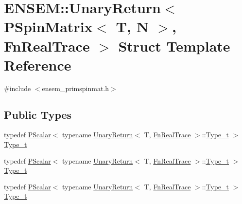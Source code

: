 \hypertarget{structENSEM_1_1UnaryReturn_3_01PSpinMatrix_3_01T_00_01N_01_4_00_01FnRealTrace_01_4}{}\section{E\+N\+S\+EM\+:\+:Unary\+Return$<$ P\+Spin\+Matrix$<$ T, N $>$, Fn\+Real\+Trace $>$ Struct Template Reference}
\label{structENSEM_1_1UnaryReturn_3_01PSpinMatrix_3_01T_00_01N_01_4_00_01FnRealTrace_01_4}


{\ttfamily \#include $<$ensem\+\_\+primspinmat.\+h$>$}

\subsection*{Public Types}
\begin{DoxyCompactItemize}
\item 
typedef \mbox{\hyperlink{classENSEM_1_1PScalar}{P\+Scalar}}$<$ typename \mbox{\hyperlink{structENSEM_1_1UnaryReturn}{Unary\+Return}}$<$ T, \mbox{\hyperlink{structENSEM_1_1FnRealTrace}{Fn\+Real\+Trace}} $>$\+::\mbox{\hyperlink{structENSEM_1_1UnaryReturn_3_01PSpinMatrix_3_01T_00_01N_01_4_00_01FnRealTrace_01_4_a7a7a0fb32831cb5d3323377a17f96cdd}{Type\+\_\+t}} $>$ \mbox{\hyperlink{structENSEM_1_1UnaryReturn_3_01PSpinMatrix_3_01T_00_01N_01_4_00_01FnRealTrace_01_4_a7a7a0fb32831cb5d3323377a17f96cdd}{Type\+\_\+t}}
\item 
typedef \mbox{\hyperlink{classENSEM_1_1PScalar}{P\+Scalar}}$<$ typename \mbox{\hyperlink{structENSEM_1_1UnaryReturn}{Unary\+Return}}$<$ T, \mbox{\hyperlink{structENSEM_1_1FnRealTrace}{Fn\+Real\+Trace}} $>$\+::\mbox{\hyperlink{structENSEM_1_1UnaryReturn_3_01PSpinMatrix_3_01T_00_01N_01_4_00_01FnRealTrace_01_4_a7a7a0fb32831cb5d3323377a17f96cdd}{Type\+\_\+t}} $>$ \mbox{\hyperlink{structENSEM_1_1UnaryReturn_3_01PSpinMatrix_3_01T_00_01N_01_4_00_01FnRealTrace_01_4_a7a7a0fb32831cb5d3323377a17f96cdd}{Type\+\_\+t}}
\item 
typedef \mbox{\hyperlink{classENSEM_1_1PScalar}{P\+Scalar}}$<$ typename \mbox{\hyperlink{structENSEM_1_1UnaryReturn}{Unary\+Return}}$<$ T, \mbox{\hyperlink{structENSEM_1_1FnRealTrace}{Fn\+Real\+Trace}} $>$\+::\mbox{\hyperlink{structENSEM_1_1UnaryReturn_3_01PSpinMatrix_3_01T_00_01N_01_4_00_01FnRealTrace_01_4_a7a7a0fb32831cb5d3323377a17f96cdd}{Type\+\_\+t}} $>$ \mbox{\hyperlink{structENSEM_1_1UnaryReturn_3_01PSpinMatrix_3_01T_00_01N_01_4_00_01FnRealTrace_01_4_a7a7a0fb32831cb5d3323377a17f96cdd}{Type\+\_\+t}}
\end{DoxyCompactItemize}


